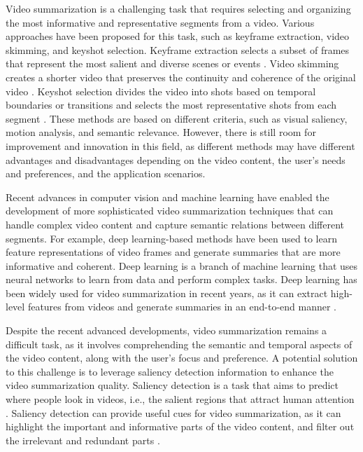\documentclass[14pt]{extarticle}
\begin{document}
    Video summarization is a challenging task that requires selecting and organizing the most informative and representative segments from a video. Various approaches have been proposed for this task, such as keyframe extraction, video skimming, and keyshot selection. Keyframe extraction selects a subset of frames that represent the most salient and diverse scenes or events \cite{batoi2019video}. Video skimming creates a shorter video that preserves the continuity and coherence of the original video \cite{linkedin2021video}. Keyshot selection divides the video into shots based on temporal boundaries or transitions and selects the most representative shots from each segment \cite{rroij2015video}. These methods are based on different criteria, such as visual saliency, motion analysis, and semantic relevance. However, there is still room for improvement and innovation in this field, as different methods may have different advantages and disadvantages depending on the video content, the user’s needs and preferences, and the application scenarios.

    Recent advances in computer vision and machine learning have enabled the development of more sophisticated video summarization techniques that can handle complex video content and capture semantic relations between different segments. For example, deep learning-based methods have been used to learn feature representations of video frames and generate summaries that are more informative and coherent. Deep learning is a branch of machine learning that uses neural networks to learn from data and perform complex tasks. Deep learning has been widely used for video summarization in recent years, as it can extract high-level features from videos and generate summaries in an end-to-end manner \cite{zhou2018deep, apostolidis2021video}.

    Despite the recent advanced developments, video summarization remains a difficult task, as it involves comprehending the semantic and temporal aspects of the video content, along with the user’s focus and preference. A potential solution to this challenge is to leverage saliency detection information to enhance the video summarization quality. Saliency detection is a task that aims to predict where people look in videos, i.e., the salient regions that attract human attention \cite{wang2019revisiting}. Saliency detection can provide useful cues for video summarization, as it can highlight the important and informative parts of the video content, and filter out the irrelevant and redundant parts \cite{zhang2016summary}.
\end{document}
